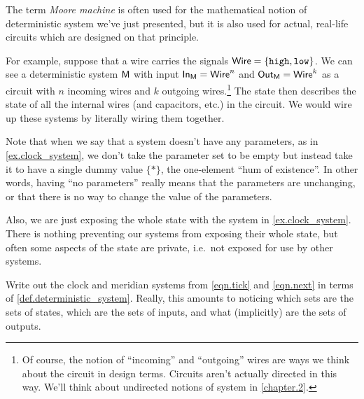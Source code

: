 \documentclass[DynamicalBook]{subfiles}
\begin{document}
\begin{example}\label{ex.moore_machine}
  The term \emph{Moore machine} is often used for the mathematical notion of
  deterministic system we've just presented, but it is also used for actual,
  real-life circuits which are designed on that principle.

  For example, suppose that a wire carries the signals $\mathsf{Wire} =
  \{\mathtt{high}, \mathtt{low}\}$. We can see a deterministic system $\mathsf{M}$
  with input $\mathsf{In}_{\mathsf{M}} = \mathsf{Wire}^n$ and $\mathsf{Out}_{\mathsf{M}} = \mathsf{Wire}^k$ as a circuit
  with $n$ incoming wires and $k$ outgoing wires.\footnote{Of course, the notion
  of ``incoming'' and ``outgoing'' wires are ways we think about the circuit in
  design terms. Circuits aren't actually directed in this way. We'll think about
undirected notions of system in \cref{chapter.2}.} The state then describes the
state of all the internal wires (and capacitors, etc.) in the circuit. We would wire up these systems by literally wiring them together. 

\end{example}

Note that when we say that a system doesn't have any parameters, as in \cref{ex.clock_system}, we don't take the
parameter set to be empty but instead take it to have a single dummy value $\{*\}$, the one-element ``hum of existence''. In other words, having ``no parameters'' really means that the parameters are unchanging, or that there is no way to change the value of the parameters.

Also, we are just exposing the whole state with the system in \cref{ex.clock_system}. There is nothing preventing our systems
from exposing their whole state, but often some aspects of the state are private, i.e.\ not exposed for use by other systems. 

\begin{exercise}\label{exc.clock_meridian_diner}
  Write out the clock and meridian systems from \eqref{eqn.tick} and \eqref{eqn.next} in terms of
  \cref{def.deterministic_system}. Really, this amounts to noticing which sets
  are the sets of states, which are the sets of inputs, and what (implicitly)
  are the sets of outputs.
\end{exercise}
\end{document}
